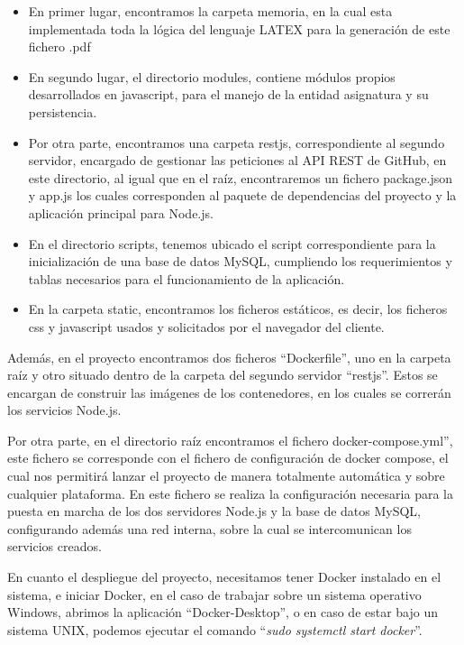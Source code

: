\begin{itemize}
  \item En primer lugar, encontramos la carpeta memoria, en la cual esta implementada toda la lógica del lenguaje LATEX para la generación de este fichero .pdf
  
  \item En segundo lugar, el directorio modules, contiene módulos propios desarrollados en javascript, para el manejo de la entidad asignatura y su persistencia.
  
  \item Por otra parte, encontramos una carpeta restjs, correspondiente al segundo servidor, encargado de gestionar las peticiones al API REST de GitHub, en este directorio, al igual que en el raíz, encontraremos un fichero package.json y app.js los cuales corresponden al paquete de dependencias del proyecto y la aplicación principal para Node.js.
  
  \item En el directorio scripts, tenemos ubicado el script correspondiente para la inicialización de una base de datos MySQL, cumpliendo los requerimientos y tablas necesarios para el funcionamiento de la aplicación.
  
  \item En la carpeta static, encontramos los ficheros estáticos, es decir, los ficheros css y javascript usados y solicitados por el navegador del cliente.
\end{itemize}

Además, en el proyecto encontramos dos ficheros ``Dockerfile'', uno en la carpeta raíz y otro situado dentro de la carpeta del segundo servidor ``restjs''. Estos se encargan de construir las imágenes de los contenedores, en los cuales se correrán los servicios Node.js.

Por otra parte, en el directorio raíz encontramos el fichero docker-compose.yml'', este fichero se corresponde con el fichero de configuración de docker compose, el cual nos permitirá lanzar el proyecto de manera totalmente automática y sobre cualquier plataforma. En este fichero se realiza la configuración necesaria para la puesta en marcha de los dos servidores Node.js y la base de datos MySQL, configurando además una red interna, sobre la cual se intercomunican los servicios creados.

En cuanto el despliegue del proyecto, necesitamos tener Docker instalado en el sistema, e iniciar Docker, en el caso de trabajar sobre un sistema operativo Windows, abrimos la aplicación ``Docker-Desktop''\cite{DockerDesktop}, o en caso de estar bajo un sistema UNIX, podemos ejecutar el comando ``\emph{sudo systemctl start docker}''.

